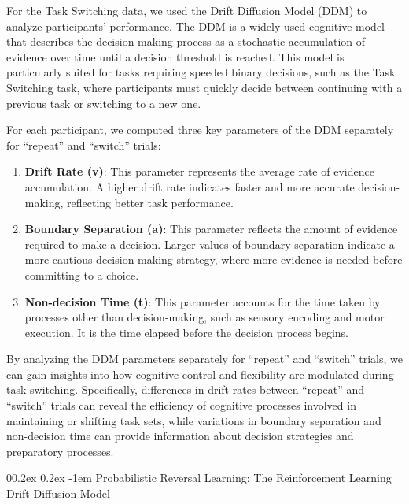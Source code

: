 \documentclass[
  man]{apa6}
\makeatletter
\let\oldparagraph\paragraph
\renewcommand{\paragraph}{
    \@ifstar
      \xxxParagraphStar
      \xxxParagraphNoStar
  }
\newcommand{\xxxParagraphStar}[1]{\oldparagraph*{#1}\mbox{}}
\newcommand{\xxxParagraphNoStar}[1]{\oldparagraph{#1}\mbox{}}
\renewcommand{\paragraph}{\@startsection{paragraph}{4}{\parindent}%
  {0\baselineskip \@plus 0.2ex \@minus 0.2ex}%
  {-1em}%
  {\normalfont\normalsize\bfseries\itshape\typesectitle}}
\makeatother
\begin{document}
For the Task Switching data, we used the Drift Diffusion Model (DDM) to analyze participants' performance. The DDM is a widely used cognitive model that describes the decision-making process as a stochastic accumulation of evidence over time until a decision threshold is reached. This model is particularly suited for tasks requiring speeded binary decisions, such as the Task Switching task, where participants must quickly decide between continuing with a previous task or switching to a new one.

For each participant, we computed three key parameters of the DDM separately for ``repeat'' and ``switch'' trials:

\begin{enumerate}
\def\labelenumi{\arabic{enumi}.}
\item
  \textbf{Drift Rate (v)}: This parameter represents the average rate of evidence accumulation. A higher drift rate indicates faster and more accurate decision-making, reflecting better task performance.
\item
  \textbf{Boundary Separation (a)}: This parameter reflects the amount of evidence required to make a decision. Larger values of boundary separation indicate a more cautious decision-making strategy, where more evidence is needed before committing to a choice.
\item
  \textbf{Non-decision Time (t)}: This parameter accounts for the time taken by processes other than decision-making, such as sensory encoding and motor execution. It is the time elapsed before the decision process begins.
\end{enumerate}

By analyzing the DDM parameters separately for ``repeat'' and ``switch'' trials, we can gain insights into how cognitive control and flexibility are modulated during task switching. Specifically, differences in drift rates between ``repeat'' and ``switch'' trials can reveal the efficiency of cognitive processes involved in maintaining or shifting task sets, while variations in boundary separation and non-decision time can provide information about decision strategies and preparatory processes.

\paragraph{Probabilistic Reversal Learning: The Reinforcement Learning Drift Diffusion Model}\label{probabilistic-reversal-learning-the-reinforcement-learning-drift-diffusion-model}
\end{document}
